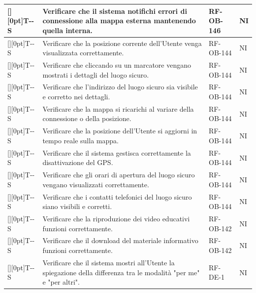 \documentclass[a4paper,12pt]{article}
\newcounter{testsys}
\newcommand{\systestcode}{%
  \raisebox{0pt}[\height][0pt]{\hypertarget{T-\arabic{testsys}-S}{}}T-\arabic{testsys}-S%
}
\begin{document}
\begin{longtable}{| >{\centering\arraybackslash}p{} | >{\raggedright\arraybackslash}p{} | >{\centering\arraybackslash}p{} | >{\centering\arraybackslash}p{} |}
\stepcounter{testsys} \systestcode & Verificare che il sistema notifichi errori di connessione alla mappa esterna mantenendo quella interna. & RF-OB-146 & NI \\
\hline

\stepcounter{testsys} \systestcode & Verificare che la posizione corrente dell'Utente venga visualizzata correttamente. & RF-OB-144 & NI \\
\hline

\stepcounter{testsys} \systestcode & Verificare che cliccando su un marcatore vengano mostrati i dettagli del luogo sicuro. & RF-OB-144 & NI \\
\hline

\stepcounter{testsys} \systestcode & Verificare che l'indirizzo del luogo sicuro sia visibile e corretto nei dettagli. & RF-OB-144 & NI \\
\hline

\stepcounter{testsys} \systestcode & Verificare che la mappa si ricarichi al variare della connessione o della posizione. & RF-OB-144 & NI \\
\hline

\stepcounter{testsys} \systestcode & Verificare che la posizione dell'Utente si aggiorni in tempo reale sulla mappa. & RF-OB-144 & NI \\
\hline

\stepcounter{testsys} \systestcode & Verificare che il sistema gestisca correttamente la disattivazione del GPS. & RF-OB-144 & NI \\
\hline

\stepcounter{testsys} \systestcode & Verificare che gli orari di apertura del luogo sicuro vengano visualizzati correttamente. & RF-OB-144 & NI \\
\hline

\stepcounter{testsys} \systestcode & Verificare che i contatti telefonici del luogo sicuro siano visibili e corretti. & RF-OB-144 & NI \\
\hline

\stepcounter{testsys} \systestcode & Verificare che la riproduzione dei video educativi funzioni correttamente. & RF-OB-142 & NI \\
\hline

\stepcounter{testsys} \systestcode & Verificare che il download del materiale informativo funzioni correttamente. & RF-OB-142 & NI \\
\hline

\stepcounter{testsys} \systestcode & Verificare che il sistema mostri all'Utente la spiegazione della differenza tra le modalità "per me" e "per altri". & RF-DE-1 & NI \\
\hline


\end{longtable}
\end{document}
